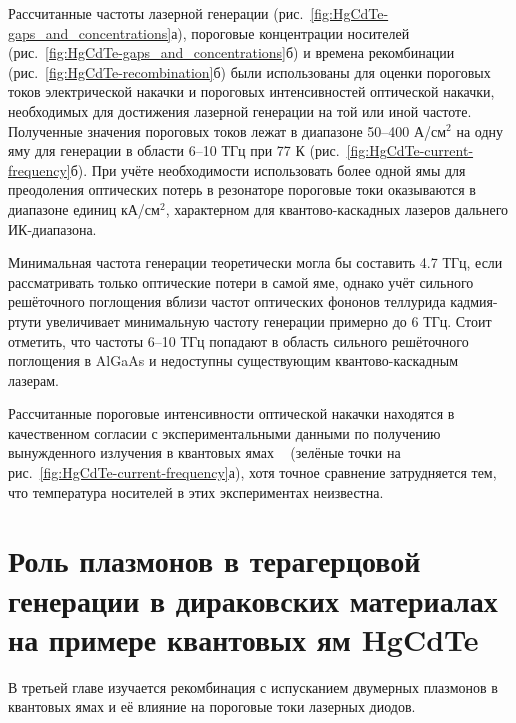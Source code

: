 Рассчитанные частоты лазерной генерации (рис.~\ref{fig:HgCdTe-gaps_and_concentrations}а), пороговые концентрации носителей (рис.~\ref{fig:HgCdTe-gaps_and_concentrations}б) и времена рекомбинации (рис.~\ref{fig:HgCdTe-recombination}б) были использованы для оценки пороговых токов электрической накачки и пороговых интенсивностей оптической накачки, необходимых для достижения лазерной генерации на той или иной частоте. Полученные значения пороговых токов лежат в диапазоне 50--400 А/см$^2$ на одну яму для генерации в области 6--10 ТГц при 77 К (рис.~\ref{fig:HgCdTe-current-frequency}б). При учёте необходимости использовать более одной ямы для преодоления оптических потерь в резонаторе пороговые токи оказываются в диапазоне единиц кА/см$^2$, характерном для квантово-каскадных лазеров дальнего ИК-диапазона. 

Минимальная частота генерации теоретически могла бы составить 4.7 ТГц, если рассматривать только оптические потери в самой яме, однако учёт сильного решёточного поглощения вблизи частот оптических фононов теллурида кадмия-ртути увеличивает минимальную частоту генерации примерно до 6 ТГц. Стоит отметить, что частоты 6--10 ТГц попадают в область сильного решёточного поглощения в AlGaAs и недоступны существующим квантово-каскадным лазерам.

Рассчитанные пороговые интенсивности оптической накачки находятся в качественном согласии с экспериментальными данными по получению вынужденного излучения в квантовых ямах \HgCdTe{}~\cite{HgCdTe-stimulated_emission} (зелёные точки на рис.~\ref{fig:HgCdTe-current-frequency}а), хотя точное сравнение затрудняется тем, что температура носителей в этих экспериментах неизвестна.

\chapter{Роль плазмонов в терагерцовой генерации в дираковских материалах на примере квантовых ям HgCdTe} \label{chapter:plasmon}
В третьей главе изучается рекомбинация с испусканием двумерных плазмонов в  квантовых ямах \HgCdTe{} и её влияние на пороговые токи лазерных диодов.
